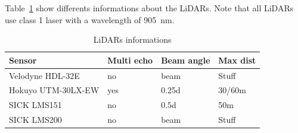 Table~\ref{tab:lidars} show differents informations about the LiDARs. Note that all LiDARs use class 1 laser with a wavelength of \SI{905}{\nano\meter}.
\begin{table}[htbp]
    \centering
    \begin{tabularx}{\linewidth}{|X||X|X|X|}\hline
        Sensor              & Multi echo & Beam angle & Max dist     \\ \hline%
        Velodyne HDL-32E    & no         & beam       & Stuff        \\ \hline
        Hokuyo UTM-30LX-EW  & yes        & 0.25d      & 30/60m       \\ \hline%
        SICK LMS151         & no         & 0.5d       & 50m          \\ \hline%
        SICK LMS200         & no         & beam       & Stuff        \\ \hline
    \end{tabularx}
    \caption{LiDARs informations}\label{tab:lidars}
\end{table}
